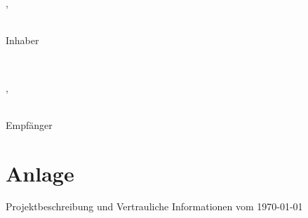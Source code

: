 \documentclass[10pt]{article}
\begin{document}
\vspace{15ex}

\begin{center}
\underline{\hspace{3in}} \\
\hspace*{0mm}\small 
\begin{Form}
    \TextField[width=3cm, value={Rolle}]{}
\end{Form}
\\
\vspace{0.2cm}

\hspace*{0mm}\small 
\begin{Form}
    \TextField[width=3cm, value={Ort}, align=2]{},
    \TextField[width=3cm, value={\today}]{}
\end{Form}
\\

\hspace*{0mm}\Large Inhaber
\end{center}

\vspace{10ex}

\begin{center}
\underline{\hspace{3in}} \\
\hspace*{0mm}\small 
\begin{Form}
    \TextField[width=3cm, value={Ort}, align=2]{},
    \TextField[width=3cm, value={\today}]{}
\end{Form}
\\

\hspace*{0mm}\Large Empfänger
\end{center}

\vspace{5ex}

\section*{Anlage}
{\Large Projektbeschreibung und Vertrauliche Informationen vom \today}\\
\end{document}
